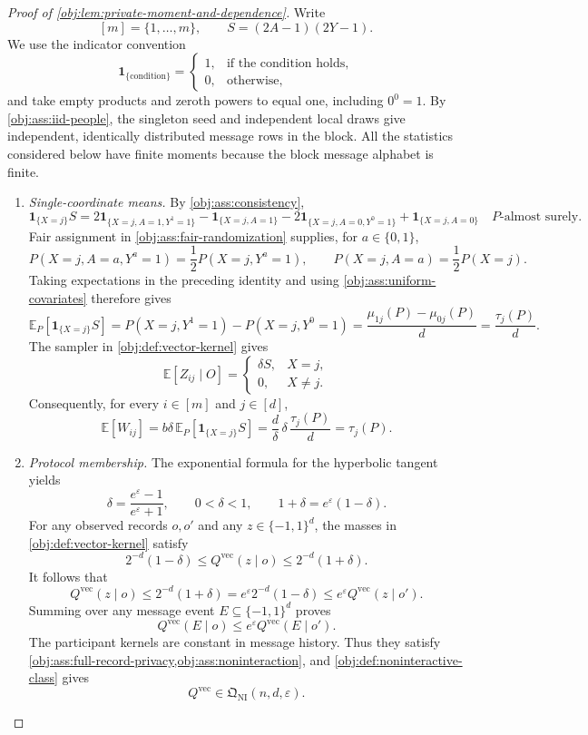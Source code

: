 \begin{proof}[Proof of \cref{obj:lem:private-moment-and-dependence}]
Write
\[
[m]=\{1,\ldots,m\},
\qquad
S=(2A-1)(2Y-1).
\]
We use the indicator convention
\[
\mathbf1_{\{\text{condition}\}}
=
\begin{cases}
1,&\text{if the condition holds},\\
0,&\text{otherwise},
\end{cases}
\]
and take empty products and zeroth powers to equal one, including \(0^0=1\).
By \cref{obj:ass:iid-people}, the singleton seed and independent local draws give independent, identically distributed message rows in the block. All the statistics considered below have finite moments because the block message alphabet is finite.

\begin{enumerate}
\item \textit{Single-coordinate means.}
By \cref{obj:ass:consistency},
\[
\mathbf1_{\{X=j\}}S
=
2\mathbf1_{\{X=j,A=1,Y^1=1\}}
-\mathbf1_{\{X=j,A=1\}}
-2\mathbf1_{\{X=j,A=0,Y^0=1\}}
+\mathbf1_{\{X=j,A=0\}}
\quad P\text{-almost surely}.
\]
Fair assignment in \cref{obj:ass:fair-randomization} supplies, for \(a\in\{0,1\}\),
\[
P(X=j,A=a,Y^a=1)=\frac12P(X=j,Y^a=1),
\qquad
P(X=j,A=a)=\frac12P(X=j).
\]
Taking expectations in the preceding identity and using
\cref{obj:ass:uniform-covariates} therefore gives
\[
\mathbb E_P[\mathbf1_{\{X=j\}}S]
=
P(X=j,Y^1=1)-P(X=j,Y^0=1)
=
\frac{\mu_{1j}(P)-\mu_{0j}(P)}d
=
\frac{\tau_j(P)}d.
\]
The sampler in \cref{obj:def:vector-kernel} gives
\[
\mathbb E[Z_{ij}\mid O]
=
\begin{cases}
\delta S,&X=j,\\
0,&X\ne j.
\end{cases}
\]
Consequently, for every \(i\in[m]\) and \(j\in[d]\),
\[
\mathbb E[W_{ij}]
=
b\delta\,\mathbb E_P[\mathbf1_{\{X=j\}}S]
=
\frac d\delta\,\delta\,\frac{\tau_j(P)}d
=
\tau_j(P).
\]

\item \textit{Protocol membership.}
The exponential formula for the hyperbolic tangent yields
\[
\delta=\frac{e^\varepsilon-1}{e^\varepsilon+1},
\qquad
0<\delta<1,
\qquad
1+\delta=e^\varepsilon(1-\delta).
\]
For any observed records \(o,o'\) and any
\(z\in\{-1,1\}^d\), the masses in
\cref{obj:def:vector-kernel} satisfy
\[
2^{-d}(1-\delta)
\le Q^{\mathrm{vec}}(z\mid o)
\le 2^{-d}(1+\delta).
\]
It follows that
\[
Q^{\mathrm{vec}}(z\mid o)
\le
2^{-d}(1+\delta)
=
e^\varepsilon2^{-d}(1-\delta)
\le
e^\varepsilon Q^{\mathrm{vec}}(z\mid o').
\]
Summing over any message event \(E\subseteq\{-1,1\}^d\) proves
\[
Q^{\mathrm{vec}}(E\mid o)
\le e^\varepsilon Q^{\mathrm{vec}}(E\mid o').
\]
The participant kernels are constant in message history. Thus they satisfy
\cref{obj:ass:full-record-privacy,obj:ass:noninteraction}, and
\cref{obj:def:noninteractive-class} gives
\[
Q^{\mathrm{vec}}\in\mathfrak Q_{\mathrm{NI}}(n,d,\varepsilon).
\]


\end{enumerate}
\end{proof}
